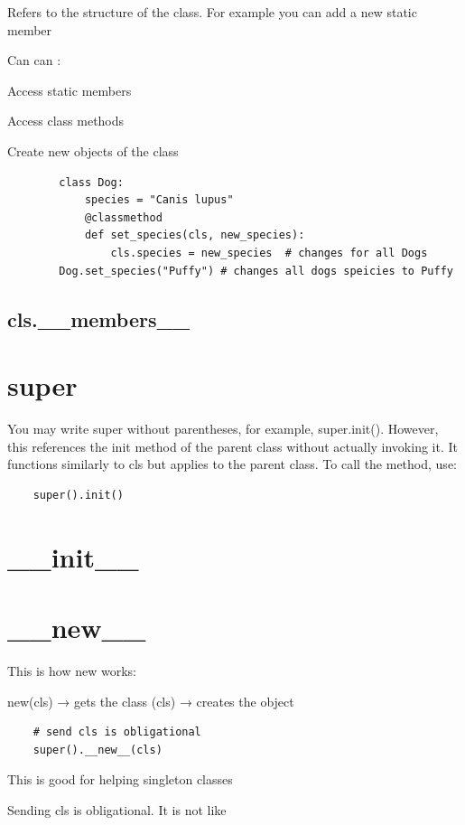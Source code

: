 Refers to the structure of the class. For example you can add a new static member

Can can :

Access static members

Access class methods

Create new objects of the class

\begin{verbatim}
        class Dog:
            species = "Canis lupus"
            @classmethod
            def set_species(cls, new_species):
                cls.species = new_species  # changes for all Dogs
        Dog.set_species("Puffy") # changes all dogs speicies to Puffy
\end{verbatim}

\subsection{cls.\_\_members\_\_}

\section{super}
You may write super without parentheses, for example, super.init(). However, this references the init method of the parent class without actually invoking it. It functions similarly to cls but applies to the parent class. To call the method, use:

\begin{verbatim}
    super().init()
\end{verbatim}

\section{\_\_init\_\_}

\section{\_\_new\_\_}

This is how new works:

new(cls) → gets the class (cls) → creates the object

\begin{verbatim}
    # send cls is obligational
    super().__new__(cls)
\end{verbatim}

This is good for helping singleton classes


Sending cls is obligational. It is not like

